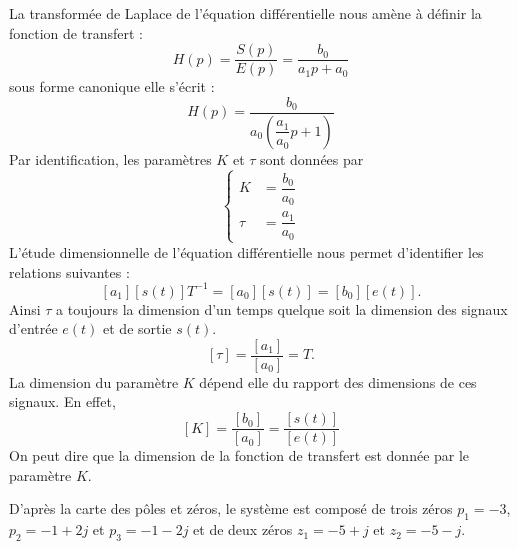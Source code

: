La transformée de Laplace de l'équation différentielle nous amène à définir
la fonction de transfert :
\[
    H(p)= \dfrac{S(p)}{E(p)}=\dfrac{b_0}{a_1p+a_0}
\]
sous forme canonique elle s'écrit :
\[
    H(p)=\dfrac{b_0}{a_0\left(\dfrac{a_1}{a_0}p+1\right)}
\]
Par identification, les paramètres $K$ et $\tau$ sont données par 
\[
    \begin{cases}
        K&=\dfrac{b_0}{a_0}\\[1.5em]
     \tau&=\dfrac{a_1}{a_0}
    \end{cases}
\]
L'étude dimensionnelle de l'équation différentielle nous permet d'identifier
les relations suivantes :
\[
    [a_1][s(t)] T^{-1} = [a_0][s(t)] = [b_0][e(t)].
\]
Ainsi $\tau$ a toujours la dimension d'un temps quelque soit la dimension des 
signaux d'entrée  $e(t)$ et de sortie $s(t)$.
\[
    [\tau] = \dfrac{[a_1]}{[a_0]}= T.
\]
La dimension du paramètre $K$ dépend elle du rapport des dimensions de ces 
signaux. En effet,
\[
    [K]=\dfrac{[b_0]}{[a_0]}=\dfrac{[s(t)]}{[e(t)]}
\]
On peut dire que la dimension de la fonction de transfert est donnée par 
le paramètre $K$.

D'après la carte des pôles et zéros, le système est composé de trois zéros
$p_1=-3$, $p_2=-1+2j$ et $p_3=-1-2j$ et de deux zéros $z_1=-5+j$ et $z_2=-5-j$.


